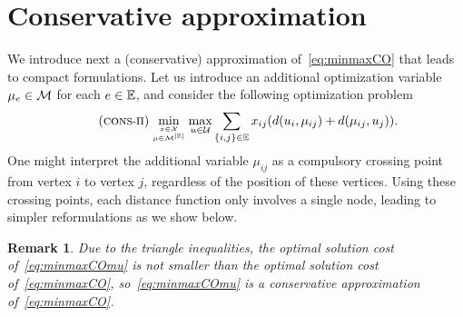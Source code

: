 \documentclass[12pt]{article}
\newtheorem{remark}{Remark}
\newcommand{\blue}[1]{{\color{black}#1}}
\begin{document}
\section{Conservative approximation}
\label{sec:adr}

We introduce next a (conservative) approximation of~\ref{eq:minmaxCO} that leads to compact formulations. Let us introduce an additional optimization variable $\mu_e\in\mathcal{M}$ for each $e\in \mathbb{E}$, and consider the following optimization problem 
\begin{equation}
\tag{\CONSERVATIVE{$\Pi$}}
\label{eq:minmaxCOmu}
\min_{x\in \X \atop \mu\in\Metric^{|\EE|}} \max_{\u\in\UU}\sum_{\{i,j\}\in \EE} x_{ij}(\dist{u_i}{\mu_{ij}}+\dist{\mu_{ij}}{u_j}).
\end{equation}
\blue{One might interpret the additional variable $\mu_{ij}$ as a compulsory crossing point from vertex $i$ to vertex $j$, regardless of the position of these vertices. Using these crossing points, each distance function only involves a single node, leading to simpler reformulations as we show below.}
\begin{remark}
 Due to the triangle inequalities, the optimal solution cost of~\ref{eq:minmaxCOmu} is not smaller than the optimal solution cost of~\ref{eq:minmaxCO}, so~\ref{eq:minmaxCOmu} is a conservative approximation of~\ref{eq:minmaxCO}.
\end{remark}
\end{document}
